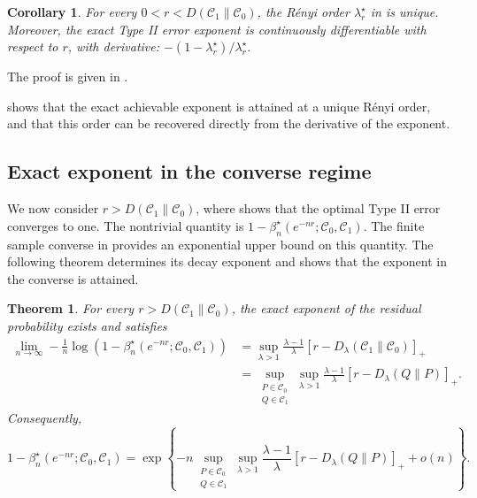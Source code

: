 \documentclass[journal,10pt,draftclsnofoot,onecolumn]{IEEEtran}
\newtheorem{theorem}{Theorem}
\newtheorem{corollary}{Corollary}
\begin{document}
\begin{corollary}
\label{cor:hoeffding-tangent}
For every $0<r<D(\mathcal C_1\|\mathcal C_0)$, the R\'enyi order $\lambda_r^\star$ in  is unique. Moreover, the exact Type II error exponent is continuously differentiable with respect to $r$, with derivative: $-(1-\lambda_r^\star)/\lambda_r^\star.$
\end{corollary}
The proof is given in .

 shows that the exact achievable exponent is attained at a unique R\'enyi order, and that this order can be recovered directly from the derivative of the exponent.

\subsection{Exact exponent in the converse regime}
\label{sec:exact-strong-converse-exponent}

We now consider $r>D(\mathcal C_1\|\mathcal C_0)$, where  shows that the optimal Type II error converges to one. The nontrivial quantity is $1-\beta_n^\star(e^{-nr};\mathcal C_0,\mathcal C_1)$. The finite sample converse in  provides an exponential upper bound on this quantity. The following theorem determines its decay exponent and shows that the exponent in the converse is attained.

\begin{theorem}
\label{thm:exact-composite-strong-converse-exponent}
For every $r>D(\mathcal C_1\|\mathcal C_0)$, the exact exponent of the
residual probability exists and satisfies
\begin{align}
\lim_{n\to\infty}-\frac{1}{n}\log\left(1-\beta_n^\star(e^{-nr};\mathcal C_0,\mathcal C_1)\right)&=\sup_{\lambda>1}\frac{\lambda-1}{\lambda}\left[r-D_\lambda(\mathcal C_1\|\mathcal C_0)\right]_+
\label{eq:exact-composite-strong-converse-exponent}
\\&=\sup_{\substack{P\in\mathcal C_0\\Q\in\mathcal C_1}}\sup_{\lambda>1}\frac{\lambda-1}{\lambda}\left[r-D_\lambda(Q\|P)\right]_+.
\label{eq:composite-strong-converse-pairwise}
\end{align}
Consequently,
\begin{equation}
1-\beta_n^\star(e^{-nr};\mathcal C_0,\mathcal C_1)=\exp\left\{-n\sup_{\substack{P\in\mathcal C_0\\Q\in\mathcal C_1}}\sup_{\lambda>1} \frac{\lambda-1}{\lambda} \left[r-D_\lambda(Q\|P)\right]_+ +o(n) \right\}.
\label{eq:strong-converse-exact-asymptotic}
\end{equation}
\end{theorem}
\end{document}
